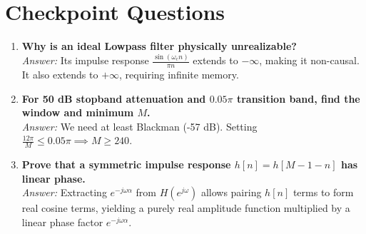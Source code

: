 \documentclass[11pt,a4paper]{article}
\begin{document}
\section{Checkpoint Questions}
\begin{enumerate}
    \item \textbf{Why is an ideal Lowpass filter physically unrealizable?} \\
    \textit{Answer:} Its impulse response $\frac{\sin(\omega_c n)}{\pi n}$ extends to $-\infty$, making it non-causal. It also extends to $+\infty$, requiring infinite memory.
    \item \textbf{For 50 dB stopband attenuation and $0.05\pi$ transition band, find the window and minimum $M$.} \\
    \textit{Answer:} We need at least Blackman (-57 dB). Setting $\frac{12\pi}{M} \le 0.05\pi \implies M \ge 240$.
    \item \textbf{Prove that a symmetric impulse response $h[n]=h[M-1-n]$ has linear phase.} \\
    \textit{Answer:} Extracting $e^{-j\omega \alpha}$ from $H(e^{j\omega})$ allows pairing $h[n]$ terms to form real cosine terms, yielding a purely real amplitude function multiplied by a linear phase factor $e^{-j\omega \alpha}$.
\end{enumerate}
\end{document}
